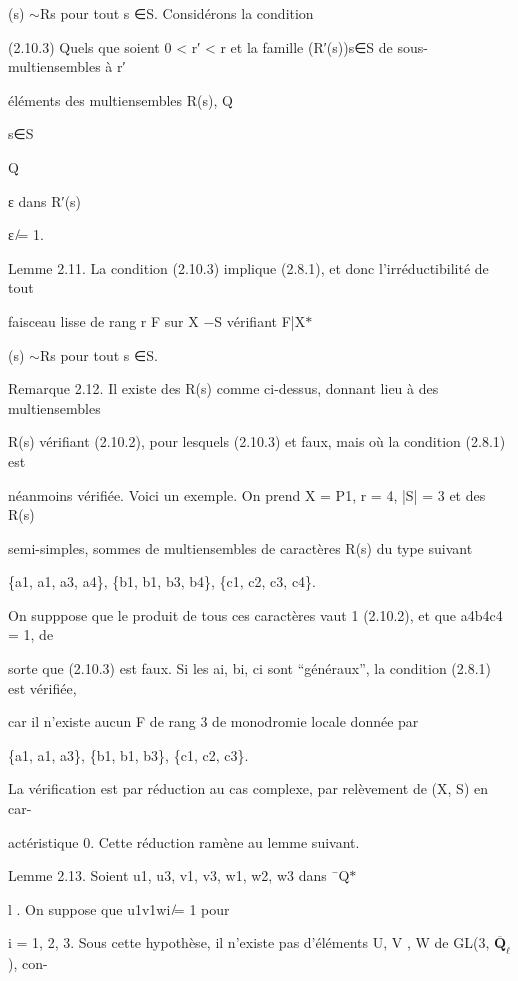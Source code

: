 \documentclass[11pt]{article}
\begin{document}
\noindent (s) \(\sim\)Rs pour tout s ∈S. Considérons la condition\par
\noindent (2.10.3) Quels que soient 0 < r′ < r et la famille (R′(s))s∈S de sous-multiensembles à r′\par
\noindent éléments des multiensembles R(s), Q\par
\noindent s∈S\par
\noindent Q\par
\noindent ε dans R′(s)\par
\noindent ε ̸= 1.\par
\noindent Lemme 2.11. La condition (2.10.3) implique (2.8.1), et donc l’irréductibilité de tout\par
\noindent faisceau lisse de rang r F sur X −S vérifiant F|X\(*\)\par
\noindent (s) \(\sim\)Rs pour tout s ∈S.\par
\noindent Remarque 2.12. Il existe des R(s) comme ci-dessus, donnant lieu à des multiensembles\par
\noindent R(s) vérifiant (2.10.2), pour lesquels (2.10.3) et faux, mais où la condition (2.8.1) est\par
\noindent néanmoins vérifiée. Voici un exemple. On prend X = P1, r = 4, |S| = 3 et des R(s)\par
\noindent semi-simples, sommes de multiensembles de caractères R(s) du type suivant\par
\noindent \{a1, a1, a3, a4\}, \{b1, b1, b3, b4\}, \{c1, c2, c3, c4\}.\par
\noindent On supppose que le produit de tous ces caractères vaut 1 (2.10.2), et que a4b4c4 = 1, de\par
\noindent sorte que (2.10.3) est faux. Si les ai, bi, ci sont “généraux”, la condition (2.8.1) est vérifiée,\par
\noindent car il n’existe aucun F de rang 3 de monodromie locale donnée par\par
\noindent \{a1, a1, a3\}, \{b1, b1, b3\}, \{c1, c2, c3\}.\par
\noindent La vérification est par réduction au cas complexe, par relèvement de (X, S) en car-\par
\noindent actéristique 0. Cette réduction ramène au lemme suivant.\par
\noindent Lemme 2.13. Soient u1, u3, v1, v3, w1, w2, w3 dans ¯Q\(*\)\par
\noindent l . On suppose que u1v1wi ̸= 1 pour\par
\noindent i = 1, 2, 3. Sous cette hypothèse, il n’existe pas d’éléments U, V , W de GL(3, \(\overline{\mathbf Q}_{\ell}\)), con-\par
\end{document}
